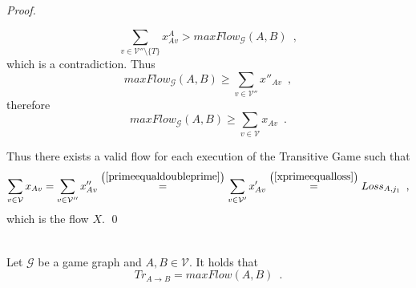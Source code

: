 \documentclass[11pt]{llncs}
\begin{document}
\begin{proof}
\begin{itemize}
\begin{equation}
             \sum\limits_{v \in \mathcal{V}'' \setminus \{T\}}x^A_{Av} > maxFlow_{\mathcal{G}}\left(A, B\right) \enspace,
          \end{equation}
          which is a contradiction. Thus
          \begin{equation}
             maxFlow_{\mathcal{G}}\left(A, B\right) \geq \sum\limits_{v \in \mathcal{V}''}x''_{Av} \enspace,
          \end{equation}
          therefore
          \begin{equation}
             maxFlow_{\mathcal{G}}\left(A, B\right) \geq \sum\limits_{v \in \mathcal{V}}x_{Av} \enspace.
          \end{equation}
       \end{itemize}
       Thus there exists a valid flow for each execution of the Transitive Game such that
       \begin{equation}
          \sum\limits_{v \in \mathcal{V}}x_{Av} = \sum\limits_{v \in \mathcal{V}''}x''_{Av}
          \overset{\left(\ref{primeequaldoubleprime}\right)}{=} \sum\limits_{v \in \mathcal{V}'}x'_{Av}
          \overset{\left(\ref{xprimeequalloss}\right)}{=} Loss_{A, j_1} \enspace,
       \end{equation}
       which is the flow $X$. \qed
    \end{proof}
    \begin{theorem} \ \\
       \label{trustflow}
       Let $\mathcal{G}$ be a game graph and $A, B \in \mathcal{V}$. It holds that
       \begin{equation}
          Tr_{A \rightarrow B} = maxFlow\left(A, B\right) \enspace.
       \end{equation}
    \end{theorem}
\end{document}
